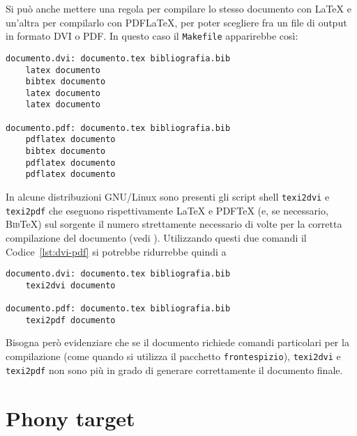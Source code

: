 Si può anche mettere una regola per compilare lo stesso documento con \LaTeX{}
e un'altra per compilarlo con \textsc{PDF}\LaTeX, per poter scegliere fra un
file di output in formato \textsc{DVI} o \textsc{PDF}.  In questo caso il
\verb|Makefile| apparirebbe così:
\begin{lstlisting}[caption={La prima regola permette di compilare un documento con
\LaTeX, la seconda con \textsc{PDF}\LaTeX},label=lst:dvi-pdf]
documento.dvi: documento.tex bibliografia.bib
	latex documento
	bibtex documento
	latex documento
	latex documento

documento.pdf: documento.tex bibliografia.bib
	pdflatex documento
	bibtex documento
	pdflatex documento
	pdflatex documento
\end{lstlisting}

In alcune distribuzioni GNU/Linux sono presenti gli script shell \verb|texi2dvi|
e \verb|texi2pdf| che eseguono rispettivamente \LaTeX{}
e \textsc{PDF}\TeX{}
(e, se necessario, \textsc{Bib}\TeX) sul sorgente il numero strettamente
necessario di volte per la corretta compilazione del documento (vedi
\textcite[63]{caucci:tabelle}).  Utilizzando questi due comandi il
Codice~\ref{lst:dvi-pdf} si potrebbe ridurrebbe quindi a
\begin{lstlisting}
documento.dvi: documento.tex bibliografia.bib
	texi2dvi documento

documento.pdf: documento.tex bibliografia.bib
	texi2pdf documento
\end{lstlisting}
Bisogna però evidenziare che se il documento richiede comandi particolari per la
compilazione (come quando si utilizza il pacchetto \verb|frontespizio|),
\verb|texi2dvi| e \verb|texi2pdf| non sono più in grado di generare
correttamente il documento finale.


\section{Phony target}
\label{sec:phony}

